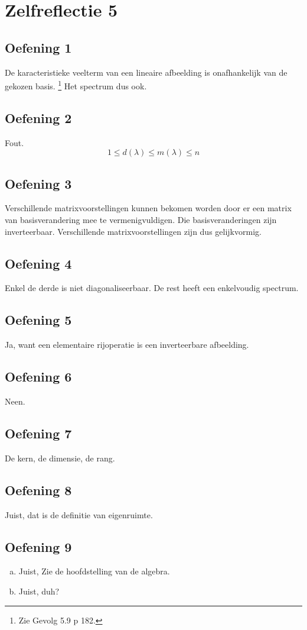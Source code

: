 \documentclass[lineaire_algebra_oplossingen.tex]{subfiles}
\begin{document}
\section{Zelfreflectie 5}
\subsection{Oefening 1}
De karacteristieke veelterm van een lineaire afbeelding is onafhankelijk van de gekozen basis. \footnote{Zie Gevolg 5.9 p 182.}
Het spectrum dus ook.

\subsection{Oefening 2}
Fout.
\[
1 \le d(\lambda) \le m(\lambda) \le n
\]

\subsection{Oefening 3}
Verschillende matrixvoorstellingen kunnen bekomen worden door er een matrix van basisverandering mee te vermenigvuldigen.
Die basisveranderingen zijn inverteerbaar. 
Verschillende matrixvoorstellingen zijn dus gelijkvormig.

\subsection{Oefening 4}
Enkel de derde is niet diagonaliseerbaar. De rest heeft een enkelvoudig spectrum.

\subsection{Oefening 5}
Ja, want een elementaire rijoperatie is een inverteerbare afbeelding.

\subsection{Oefening 6}
Neen.

\subsection{Oefening 7}
De kern, de dimensie, de rang. 

\subsection{Oefening 8}
Juist, dat is de definitie van eigenruimte.

\subsection{Oefening 9}
\begin{enumerate}[(a)]
\item Juist, Zie de hoofdstelling van de algebra.
\item Juist, duh?
\end{enumerate}
\end{document}
